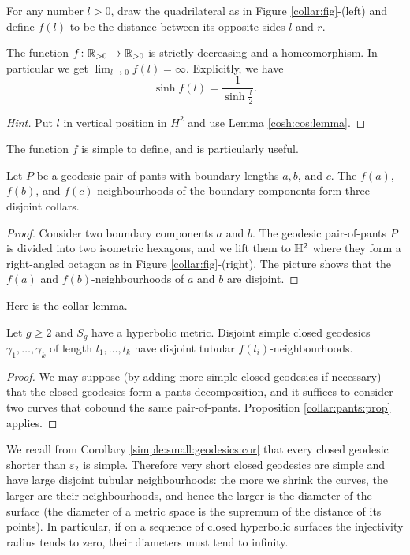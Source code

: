 For any number $l>0$, draw the quadrilateral as in Figure \ref{collar:fig}-(left) and define $f(l)$ to be the distance between its opposite sides $l$ and $r$.

\begin{ex} The function $f\colon \mathbb{R}_{>0}\to \mathbb{R}_{>0}$ is strictly decreasing and a homeomorphism. In particular we get
$\lim_{l \to 0} f(l) = \infty$. 
Explicitly, we have 
$$\sinh f(l) = \frac{1}{\sinh \frac l2}.$$ 
\end{ex}
\begin{proof}[Hint]
Put $l$ in vertical position in $H^2$ and use Lemma \ref{cosh:cos:lemma}.
\end{proof}

The function $f$ is simple to define, and is particularly useful.

\begin{prop} \label{collar:pants:prop}
Let $P$ be a geodesic pair-of-pants with boundary lengths $a,b$, and $c$. The $f(a)$, $f(b)$, and $f(c)$-neighbourhoods of the boundary components form three disjoint collars.
\end{prop}
\begin{proof}
Consider two boundary components $a$ and $b$. 
The geodesic pair-of-pants $P$ is divided into two isometric hexagons, and we lift them to $\mathbb{H}^2$ where they form a right-angled octagon as in Figure \ref{collar:fig}-(right). The picture shows that the $f(a)$ and $f(b)$-neighbourhoods of $a$ and $b$ are disjoint.
\end{proof}

Here is the collar lemma.

\begin{lemma} \label{collar:lemma}
Let $g\geqslant 2$ and $S_g$ have a hyperbolic metric. Disjoint simple closed geodesics $\gamma_1, \ldots, \gamma_k$ of length $l_1,\ldots, l_k$ have disjoint tubular $f(l_i)$-neighbourhoods. 
\end{lemma}
\begin{proof}
We may suppose (by adding more simple closed geodesics if necessary) that the closed geodesics form a pants decomposition, and it suffices to consider two curves that cobound the same pair-of-pants. Proposition \ref{collar:pants:prop} applies.
\end{proof}

We recall from Corollary \ref{simple:small:geodesics:cor} that every closed geodesic shorter than $\varepsilon_2$ is simple. Therefore very short closed geodesics are simple and have large disjoint tubular neighbourhoods: the more we shrink the curves, the larger are their neighbourhoods, and hence the larger is the diameter of the surface (the diameter of a metric space is the supremum of the distance of its points). In particular, if on a sequence of closed hyperbolic surfaces the injectivity radius tends to zero, their diameters must tend to infinity.

